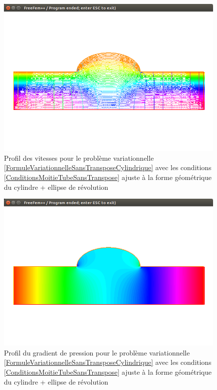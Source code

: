 \documentclass[11pt,a4paper]{article}
\numberwithin{equation}{subsection}
\numberwithin{figure}{subsection}
\begin{document}
\begin{figure}[h]
\centering
\includegraphics[scale=0.4]{StokesClassiqueVitessesCylindreEllipse.png}
\caption{Profil des vitesses pour le problème variationnelle \ref{FormuleVariationnelleSansTransposeCylindrique} avec les conditions \ref{ConditionsMoitieTubeSansTranspose} ajuste à la forme géométrique du cylindre + ellipse de révolution}
\label{StokesClassiqueVitessesCylindreEllipse}
\end{figure}

\begin{figure}[h]
\centering
\includegraphics[scale=0.4]{StokesClassiquePressionCylindreEllipse.png}
\caption{Profil du gradient de pression pour le problème variationnelle \ref{FormuleVariationnelleSansTransposeCylindrique} avec les conditions \ref{ConditionsMoitieTubeSansTranspose} ajuste à la forme géométrique du cylindre + ellipse de révolution}
\label{StokesClassiquePressionCylindreEllipse}
\end{figure}
\end{document}

